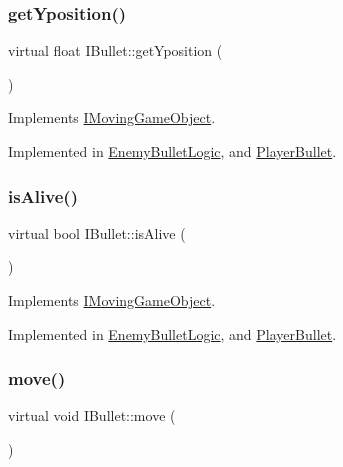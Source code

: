 \subsubsection{\texorpdfstring{get\+Yposition()}{getYposition()}}
{\footnotesize\ttfamily virtual float I\+Bullet\+::get\+Yposition (\begin{DoxyParamCaption}{ }\end{DoxyParamCaption})\hspace{0.3cm}{\ttfamily [pure virtual]}}



Implements \hyperlink{class_i_moving_game_object_a153c0017219e17262a9cceddba3f61d6}{I\+Moving\+Game\+Object}.



Implemented in \hyperlink{class_enemy_bullet_logic_a0cfb3013a7613f7f6de91a6db04d03b1}{Enemy\+Bullet\+Logic}, and \hyperlink{class_player_bullet_a240cab35d5d909366986b8661ee65d3c}{Player\+Bullet}.

\mbox{\label{class_i_bullet_ac1252496738126ec94a97512011b9112}} 
\subsubsection{\texorpdfstring{is\+Alive()}{isAlive()}}
{\footnotesize\ttfamily virtual bool I\+Bullet\+::is\+Alive (\begin{DoxyParamCaption}{ }\end{DoxyParamCaption})\hspace{0.3cm}{\ttfamily [pure virtual]}}



Implements \hyperlink{class_i_moving_game_object_ab88f75c872699dd1376e5e83f6188e34}{I\+Moving\+Game\+Object}.



Implemented in \hyperlink{class_enemy_bullet_logic_a42d10bdfde42178e272997de9b387398}{Enemy\+Bullet\+Logic}, and \hyperlink{class_player_bullet_ab4e6b1485e9a63ddc00effc7532a9b09}{Player\+Bullet}.

\mbox{\label{class_i_bullet_a0884074f0bc793fb5a52ac33842622fd}} 
\subsubsection{\texorpdfstring{move()}{move()}}
{\footnotesize\ttfamily virtual void I\+Bullet\+::move (\begin{DoxyParamCaption}{ }\end{DoxyParamCaption})\hspace{0.3cm}{\ttfamily [pure virtual]}}



